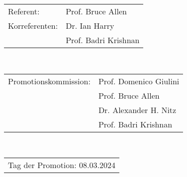 \thispagestyle{empty}
\vspace*{\fill}
\begin{flushleft}
\begin{tabular}{l l}
	Referent:      & Prof. Bruce Allen\\
	Korreferenten: & Dr. Ian Harry\\
	               & Prof. Badri Krishnan
\end{tabular}\\
\vspace{1cm}
\begin{tabular}{l l}
	Promotionskommission: & Prof. Domenico Giulini \\
	                      & Prof. Bruce Allen \\
	                      & Dr. Alexander H. Nitz \\
                        & Prof. Badri Krishnan \\
\end{tabular}\\
\vspace{1cm}
\begin{tabular}{l}
Tag der Promotion: 08.03.2024
\end{tabular}
\end{flushleft}
\newpage
